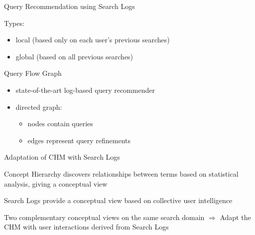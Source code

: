 \begin{frame}{Query Recommendation using Search Logs}

Types:
\begin{itemize}
	\item local (based only on each user's previous searches)
	\item global (based on all previous searches) \newline
\end{itemize}

Query Flow Graph
\begin{itemize}
	\item state-of-the-art log-based query recommender
	\item directed graph:
		\begin{itemize}
			\item nodes contain queries
			\item edges represent query refinements 
		\end{itemize}
\end{itemize}

\end{frame}


\begin{frame}{Adaptation of CHM with Search Logs}

Concept Hierarchy discovers relationships between terms based on statistical analysis, giving a conceptual view \newline

Search Logs provide a conceptual view based on collective user intelligence \newline

Two complementary conceptual views on the same search domain
$ \Rightarrow $
Adapt the CHM with user interactions derived from Search Logs

\end{frame}



